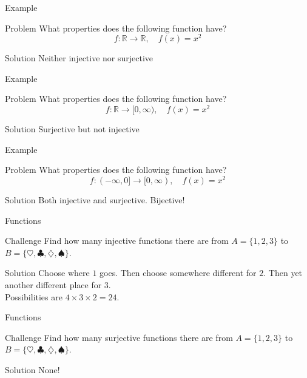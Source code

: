 \documentclass{beamer}
\begin{document}
\begin{frame}{Example}
\begin{block}{Problem}
What properties does the following function have?
$$f:\mathbb R\rightarrow\mathbb R,\quad f(x) = x^2$$
\end{block}
\pause
\begin{block}{Solution}
Neither injective nor surjective
\end{block}
\end{frame}

\begin{frame}{Example}
\begin{block}{Problem}
What properties does the following function have?
$$f:\mathbb R\rightarrow [0,\infty),\quad f(x) = x^2$$
\end{block}
\pause
\begin{block}{Solution}
Surjective but not injective
\end{block}
\end{frame}

\begin{frame}{Example}
\begin{block}{Problem}
What properties does the following function have?
$$f:(-\infty,0]\rightarrow [0,\infty),\quad f(x) = x^2$$
\end{block}
\pause
\begin{block}{Solution}
Both injective and surjective.  Bijective!
\end{block}
\end{frame}

\begin{frame}{Functions}
\begin{block}{Challenge}
Find how many injective functions there are from
$A = \{1,2,3\}$ to $B = \{\heartsuit,\clubsuit,\diamondsuit,\spadesuit\}$.
\end{block}
\pause
\begin{block}{Solution}
\pause
Choose where $1$ goes.  Then choose somewhere different for $2$. Then yet another different place for $3$.\\
Possibilities are $4\times 3\times 2 = 24$.
\end{block}
\end{frame}

\begin{frame}{Functions}
\begin{block}{Challenge}
Find how many surjective functions there are from
$A = \{1,2,3\}$ to $B = \{\heartsuit,\clubsuit,\diamondsuit,\spadesuit\}$.
\end{block}
\pause
\begin{block}{Solution}
\pause
None!
\end{block}
\end{frame}
\end{document}
